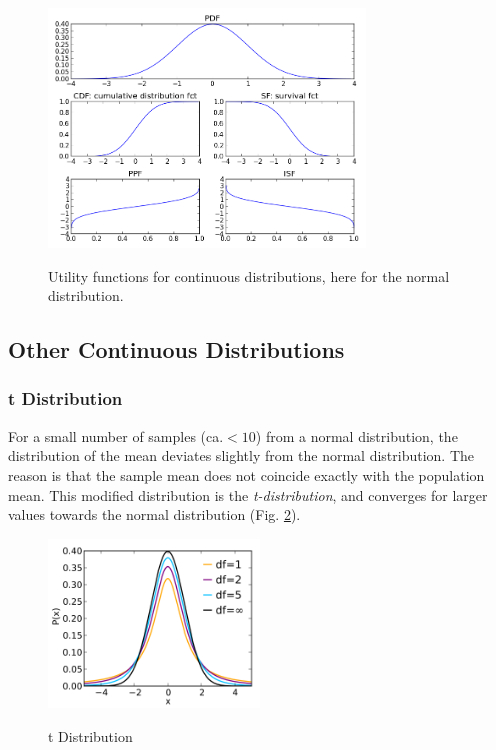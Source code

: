 \begin{figure}[h]
  \centering
  \includegraphics[width=0.75\textwidth]{../Images/DistributionFunctions.png}\\
  \caption{Utility functions for continuous distributions, here for the normal distribution.}\label{fig:DistributionUtilities}
\end{figure}


\subsection{Other Continuous Distributions}\label{sec:ContinuousDistributions} 

\subsubsection{t Distribution}
For a small number of samples (ca.$<10$) from a normal distribution, the distribution of the mean deviates slightly from the normal distribution. The reason is that the sample mean does not coincide exactly with the population mean. This modified distribution is the \emph{t-distribution}, and converges for larger values towards the normal distribution (Fig. \ref{fig:t}).

\begin{figure}
  \centering
  \includegraphics[width=0.5\textwidth]{../Images/Student_t_pdf.png}\\
  \caption{t Distribution}\label{fig:t}
\end{figure}


